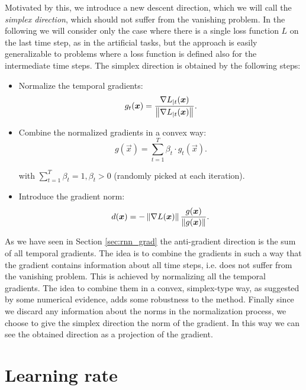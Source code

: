 Motivated by this, we introduce a new descent direction, which we will call the \textit{simplex direction},
which should not suffer from the vanishing problem. In the following we will consider only the case where there is a single loss function $L$ on the last time step, as in the artificial tasks, but the approach is easily generalizable to problems where a loss function is defined also for the intermediate time steps. The simplex direction is obtained by the following steps:


\begin{itemize}
	\item Normalize the temporal gradients:
	\begin{equation}
	g_t(\boldsymbol{x}) = \frac{\nabla L_{|t}(\boldsymbol{x})}{\left\Vert \nabla L_{|t}(\boldsymbol{x}) \right\Vert}.
	\end{equation}
	
	\item Combine the normalized gradients in a convex way:
	\begin{equation}
	g(\vec{x}) = \sum_{t=1}^T \beta_t \cdot g_t(\vec{x}).
	\end{equation}
	
	with $\sum_{t=1}^T\beta_t=1, \beta_t>0$ (randomly picked at each iteration).
	\item Introduce the gradient norm:
	\begin{equation}
	d(\boldsymbol{x}) = - \left\Vert \nabla L (\boldsymbol{x}) \right\Vert\frac{g(\boldsymbol{x})}{\left\Vert g(\boldsymbol{x}) \right\Vert}.
	\end{equation}
\end{itemize}

As we have seen in Section \ref{sec:rnn_grad} the anti-gradient direction is the sum of all temporal gradients. The idea is to combine the gradients in such a way that the gradient contains information about all time steps, i.e. does not suffer from the vanishing problem. This is achieved by normalizing all the temporal gradients. The idea to combine them in a convex, simplex-type way, as suggested by some numerical evidence, adds some robustness to the method. Finally since we discard any information about the norms in the normalization process, we choose to give the simplex direction the norm of the gradient. In this way we can see the obtained direction as a projection of the gradient.


\section{Learning rate}

